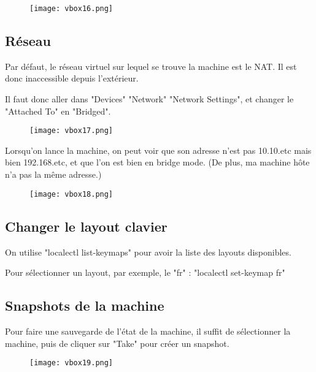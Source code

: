 \documentclass{article}
\begin{document}
\begin{figure}[h!]
		\centering
		\texttt{[image: vbox16.png]}
\end{figure}

\pagebreak

\subsection{Réseau}

Par défaut, le réseau virtuel sur lequel se trouve la machine est le NAT. Il est donc inaccessible depuis l'extérieur.

Il faut donc aller dans "Devices" \textrightarrow "Network" \textrightarrow "Network Settings", et changer le "Attached To" en "Bridged".


\begin{figure}[h!]
		\centering
		\texttt{[image: vbox17.png]}
\end{figure}

Lorsqu'on lance la machine, on peut voir que son adresse n'est pas 10.10.etc mais bien 192.168.etc, et que l'on est bien en bridge mode. (De plus, ma machine hôte n'a pas la même adresse.)

\begin{figure}[h!]
		\centering
		\texttt{[image: vbox18.png]}
\end{figure}

\pagebreak

\subsection{Changer le layout clavier}

On utilise "localectl list-keymaps" pour avoir la liste des layouts disponibles.

Pour sélectionner un layout, par exemple, le "fr" : "localectl set-keymap fr"



\subsection{Snapshots de la machine}

Pour faire une sauvegarde de l'état de la machine, il suffit de sélectionner la machine, puis de cliquer sur "Take" pour créer un snapshot.

\begin{figure}[h!]
		\centering
		\texttt{[image: vbox19.png]}
\end{figure}
\end{document}
